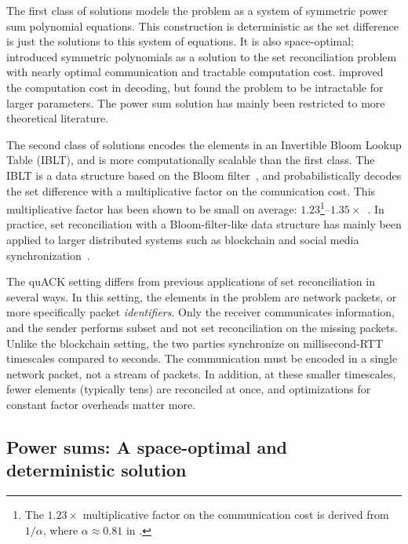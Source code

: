 The first class of solutions models the problem as a system of symmetric power
sum polynomial equations. This construction is deterministic as the set
difference is just the solutions to this system of equations. It is also
space-optimal; \cite{minsky2003set} introduced symmetric polynomials as a
solution to the set reconciliation problem with nearly optimal communication
and tractable computation cost. \cite{dodis2004fuzzy} improved the computation
cost in decoding, but found the problem to be intractable for larger parameters.
The power sum solution has mainly been restricted to more theoretical
literature.

The second class of solutions encodes the elements in an Invertible Bloom Lookup
Table (IBLT), and is more computationally scalable than the first class. The
IBLT is a data structure based on the Bloom
filter~\cite{goodrich2011invertible}, and probabilistically decodes the set
difference with a multiplicative factor on the comunication cost. This
multiplicative factor has been shown to be small on average: $1.23$\footnote{The
$1.23\times$ multiplicative factor on the communication cost is derived from
$1/\alpha$, where $\alpha \approx 0.81$ in
\cite{baek2023simple}.}--$1.35\times$~\cite{yang2024practical,baek2023simple}.
In practice, set reconciliation with a Bloom-filter-like data structure has
mainly been applied to larger distributed systems such as blockchain and social
media synchronization~\cite{yang2024practical,summermatter2021byzantine}.

The quACK setting differs from previous applications of set reconciliation in
several ways. In this setting, the elements in the problem are network packets,
or more specifically packet \textit{identifiers}. Only the receiver
communicates information, and the sender performs subset and not set
reconciliation on the missing packets. Unlike the blockchain setting, the two
parties synchronize on millisecond-RTT timescales compared to seconds. The
communication must be encoded in a single network packet, not a stream of
packets. In addition, at these smaller timescales, fewer elements
(typically tens) are reconciled at once, and optimizations for constant factor
overheads matter more.

\subsection{Power sums: A space-optimal and deterministic solution}
\label{sec:quack:constructions:power-sum}

